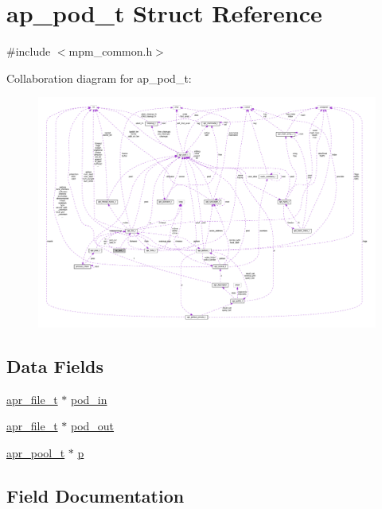 \hypertarget{structap__pod__t}{}\section{ap\+\_\+pod\+\_\+t Struct Reference}
\label{structap__pod__t}


{\ttfamily \#include $<$mpm\+\_\+common.\+h$>$}



Collaboration diagram for ap\+\_\+pod\+\_\+t\+:
\nopagebreak
\begin{figure}[H]
\begin{center}
\leavevmode
\includegraphics[width=350pt]{structap__pod__t__coll__graph}
\end{center}
\end{figure}
\subsection*{Data Fields}
\begin{DoxyCompactItemize}
\item 
\hyperlink{structapr__file__t}{apr\+\_\+file\+\_\+t} $\ast$ \hyperlink{structap__pod__t_aabb1dac17c04b94b077a7200408fa075}{pod\+\_\+in}
\item 
\hyperlink{structapr__file__t}{apr\+\_\+file\+\_\+t} $\ast$ \hyperlink{structap__pod__t_af3abbe10bc2f22a68e356313d5085c10}{pod\+\_\+out}
\item 
\hyperlink{structapr__pool__t}{apr\+\_\+pool\+\_\+t} $\ast$ \hyperlink{structap__pod__t_aec4f374a02aaa9e6e87b8fce2d8c1855}{p}
\end{DoxyCompactItemize}


\subsection{Field Documentation}
